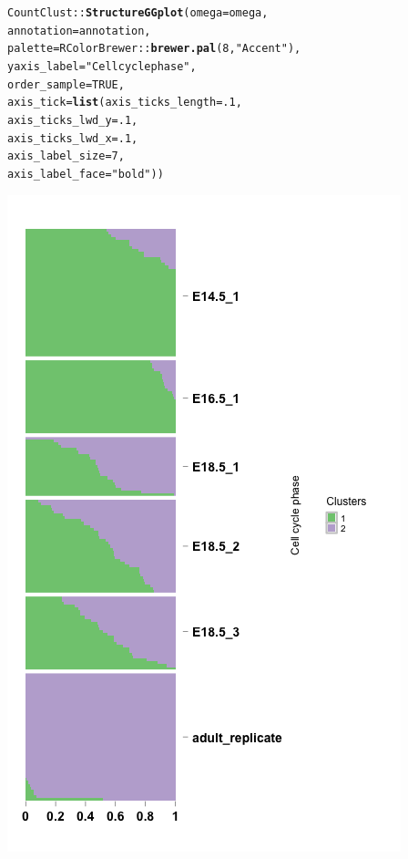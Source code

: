 \documentclass[12pt]{article}\usepackage[]{graphicx}\usepackage[usenames,dvipsnames]{color}
\makeatletter
\newcommand{\hlnum}[1]{\textcolor[rgb]{0.686,0.059,0.569}{#1}}%
\newcommand{\hlstr}[1]{\textcolor[rgb]{0.192,0.494,0.8}{#1}}%
\newcommand{\hlopt}[1]{\textcolor[rgb]{0,0,0}{#1}}%
\newcommand{\hlstd}[1]{\textcolor[rgb]{0.345,0.345,0.345}{#1}}%
\newcommand{\hlkwc}[1]{\textcolor[rgb]{0.333,0.667,0.333}{#1}}%
\newcommand{\hlkwd}[1]{\textcolor[rgb]{0.737,0.353,0.396}{\textbf{#1}}}%
\newenvironment{kframe}{%
 \def\at@end@of@kframe{}%
 \ifinner\ifhmode%
  \def\at@end@of@kframe{\end{minipage}}%
  \begin{minipage}{\columnwidth}%
 \fi\fi%
 \def\FrameCommand##1{\hskip\@totalleftmargin \hskip-\fboxsep
 \colorbox{shadecolor}{##1}\hskip-\fboxsep
     \hskip-\linewidth \hskip-\@totalleftmargin \hskip\columnwidth}%
 \MakeFramed {\advance\hsize-\width
   \@totalleftmargin\z@ \linewidth\hsize
   \@setminipage}}%
 {\par\unskip\endMakeFramed%
 \at@end@of@kframe}
\newenvironment{knitrout}{}{} %
\makeatother
\begin{document}
\begin{knitrout}
\begin{kframe}
\begin{alltt}
\hlstd{CountClust}\hlopt{::}\hlkwd{StructureGGplot}\hlstd{(}\hlkwc{omega} \hlstd{= omega,}
                \hlkwc{annotation} \hlstd{= annotation,}
                \hlkwc{palette} \hlstd{= RColorBrewer}\hlopt{::}\hlkwd{brewer.pal}\hlstd{(}\hlnum{8}\hlstd{,} \hlstr{"Accent"}\hlstd{),}
                \hlkwc{yaxis_label} \hlstd{=} \hlstr{"Cell cycle phase"}\hlstd{,}
                \hlkwc{order_sample} \hlstd{=} \hlnum{TRUE}\hlstd{,}
                \hlkwc{axis_tick} \hlstd{=} \hlkwd{list}\hlstd{(}\hlkwc{axis_ticks_length} \hlstd{=} \hlnum{.1}\hlstd{,}
                                 \hlkwc{axis_ticks_lwd_y} \hlstd{=} \hlnum{.1}\hlstd{,}
                                 \hlkwc{axis_ticks_lwd_x} \hlstd{=} \hlnum{.1}\hlstd{,}
                                 \hlkwc{axis_label_size} \hlstd{=} \hlnum{7}\hlstd{,}
                                 \hlkwc{axis_label_face} \hlstd{=} \hlstr{"bold"}\hlstd{))}
\end{alltt}
\end{kframe}
\includegraphics[width=3 in,height=5 in]{figure/structure_treutlin_classtpx_theta_fix_2-1} 

\end{knitrout}
\end{document}

